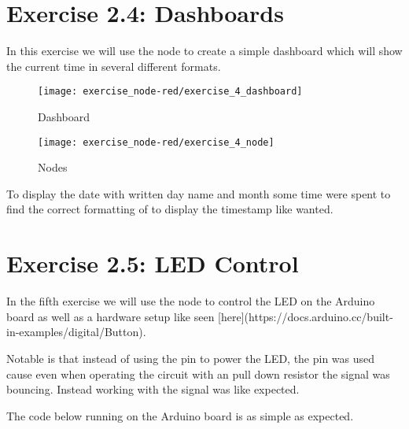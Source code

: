 \section{Exercise 2.4: Dashboards}

In this exercise we will use the  node to create a simple dashboard which will 
show the current time in several different formats.

\begin{figure}[H]
  \centering
  \texttt{[image: exercise\_node-red/exercise\_4\_dashboard]}
  \caption{Dashboard}
  \label{fig:dashboard}
\end{figure}

\begin{figure}[H]
  \centering
  \texttt{[image: exercise\_node-red/exercise\_4\_node]}
  \caption{Nodes}
  \label{fig:4_nodes}
\end{figure}

To display the date with written day name and month some time were spent to find the correct 
formatting of  to display the timestamp like wanted.


\section{Exercise 2.5: LED Control}

In the fifth exercise we will use the  node to control the LED on the Arduino board as 
well as a hardware setup like seen [here](https://docs.arduino.cc/built-in-examples/digital/Button).

Notable is that instead of using the  pin to power the LED, the  pin was used 
cause even when operating the circuit with an pull down resistor the  signal was bouncing.
Instead working with the  signal was like expected.

The code below running on the Arduino board is as simple as expected.

